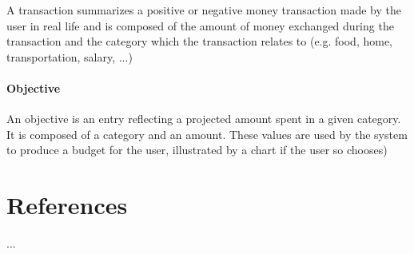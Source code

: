 \documentclass[letterpaper]{article}
\begin{document}
		A transaction summarizes a positive or negative money transaction made by the user in real life and is composed of the amount of money exchanged during the transaction and the category which the transaction relates to (e.g. food, home, transportation, salary, ...)
		
	\paragraph{Objective}
		
		An objective is an entry reflecting a projected amount spent in a given category. It is composed of a category and an amount. These values are used by the system to produce a budget for the user, illustrated by a chart if the user so chooses)
	

\section{References}

	...
	
\end{document}
